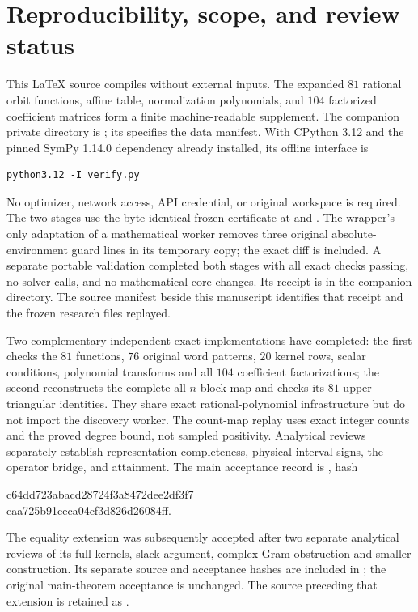 \documentclass[11pt]{article}
\begin{document}
\section{Reproducibility, scope, and review status}\label{sec:record}
This \LaTeX{} source compiles without external inputs. The expanded
$81$ rational orbit functions, affine table, normalization polynomials,
and $104$ factorized coefficient matrices form a finite machine-readable
supplement. The companion private directory is
; its
 specifies the data manifest. With CPython 3.12 and the
pinned SymPy 1.14.0 dependency already installed, its offline interface is
\begin{verbatim}
python3.12 -I verify.py
\end{verbatim}
No optimizer, network access, API credential, or original workspace is
required. The two stages use the byte-identical frozen certificate at
 and
. The wrapper's only adaptation
of a mathematical worker removes three original absolute-environment
guard lines in its temporary copy; the exact diff is included.
A separate portable validation completed both stages with all exact checks
passing, no solver calls, and no mathematical core changes. Its receipt
is  in the companion
 directory.
The source manifest beside this manuscript identifies that receipt and
the frozen research files replayed.

Two complementary independent exact implementations have completed:
the first checks the $81$ functions, $76$ original word patterns,
$20$ kernel rows, scalar conditions, polynomial transforms and all
$104$ coefficient factorizations; the second reconstructs the complete
all-$n$ block map and checks its $81$ upper-triangular identities.
They share exact rational-polynomial infrastructure but do not import
the discovery worker. The count-map replay uses exact integer counts
and the proved degree bound, not sampled positivity. Analytical reviews
separately establish representation completeness, physical-interval
signs, the operator bridge, and attainment. The main acceptance record is
, hash
\begin{center}\footnotesize\ttfamily
 c64dd723abacd28724f3a8472dee2df3f7\\
 caa725b91ceca04cf3d826d26084ff.
\end{center}
The equality extension was subsequently accepted after two separate
analytical reviews of its full kernels, slack argument, complex Gram
obstruction and smaller construction. Its separate source and acceptance
hashes are included in ; the original
main-theorem acceptance is unchanged. The source preceding that extension
is retained as .
\end{document}
